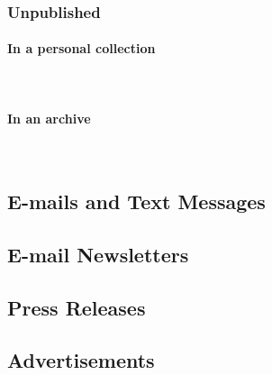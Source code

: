 \documentclass{ltxdockit}
\newcommand{\myparagraph}[1]{\paragraph{#1}\mbox{}\\}
\begin{document}
\subsubsection{Unpublished} %
\label{sub:unpublished_news}
\myparagraph{In a personal collection} %
\label{ssub:in_a_personal_collection}
\begin{refsection}
	\printbibliography[heading=none]
\end{refsection}
\myparagraph{In an archive} %
\label{ssub:in_an_archive}
\begin{refsection}
	\printbibliography[heading=none]
\end{refsection}

\subsection{E-mails and Text Messages} %
\label{sec:e_mails_and_text_messages}
\begin{refsection}
	\printbibliography[heading=none]
\end{refsection}

\subsection{E-mail Newsletters} %
\label{sec:e_mail_newsletters}
\begin{refsection}
	\printbibliography[heading=none]
\end{refsection}

\subsection{Press Releases} %
\label{sec:press_releases}
\begin{refsection}
	\printbibliography[heading=none]
\end{refsection}

\subsection{Advertisements} %
\label{sec:advertisements}
\end{document}
